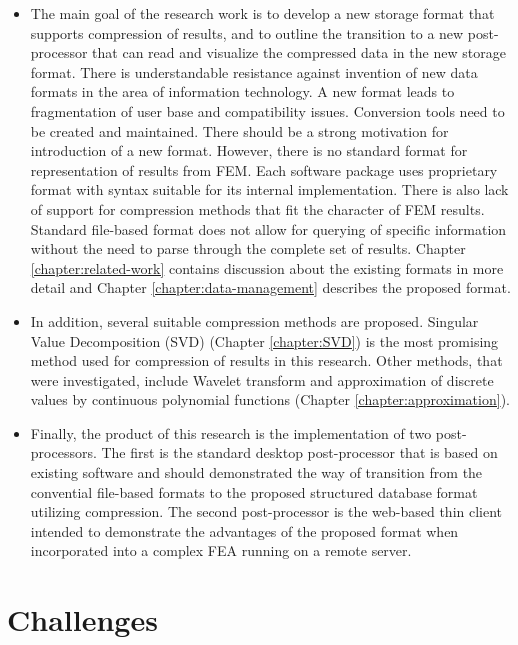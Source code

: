 \begin{itemize}
    \item The main goal of the research work is to develop a new storage format that supports compression of results, and to outline the transition to a new post-processor that can read and visualize the compressed data in the new storage format. There is understandable resistance against invention of new data formats in the area of information technology. A new format leads to fragmentation of user base and compatibility issues. Conversion tools need to be created and maintained. There should be a strong motivation for introduction of a new format. However, there is no standard format for representation of results from FEM. Each software package uses proprietary format with syntax suitable for its internal implementation. There is also lack of support for compression methods that fit the character of FEM results. Standard file-based format does not allow for querying of specific information without the need to parse through the complete set of results. Chapter \ref{chapter:related-work} contains discussion about the existing formats in more detail and Chapter \ref{chapter:data-management} describes the proposed format.
    \item In addition, several suitable compression methods are proposed. Singular Value Decomposition (SVD) (Chapter \ref{chapter:SVD}) is the most promising method used for compression of results in this research. Other methods, that were investigated, include Wavelet transform \cite{Li2014} and approximation of discrete values by continuous polynomial functions (Chapter \ref{chapter:approximation}).
    \item Finally, the product of this research is the implementation of two post-processors. The first is the standard desktop post-processor that is based on existing software and should demonstrated the way of transition from the convential file-based formats to the proposed structured database format utilizing compression. The second post-processor is the web-based thin client intended to demonstrate the advantages of the proposed format when incorporated into a complex FEA running on a remote server.
\end{itemize}


\section{Challenges}

